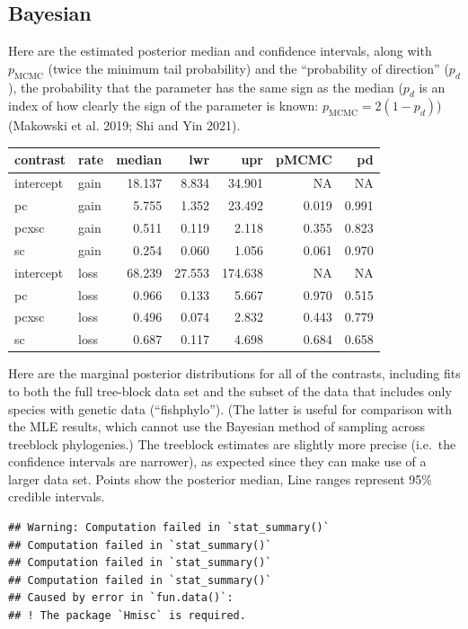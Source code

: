 \documentclass[
]{article}
\begin{document}
\hypertarget{bayesian}{%
\subsection{Bayesian}\label{bayesian}}

Here are the estimated posterior median and confidence intervals, along
with \(p_\textrm{MCMC}\) (twice the minimum tail probability) and the
``probability of direction'' (\(p_d\)), the probability that the
parameter has the same sign as the median (\(p_d\) is an index of how
clearly the sign of the parameter is known:
\(p_\textrm{MCMC} = 2(1-p_d)\)) (Makowski et al. 2019; Shi and Yin
2021).

\begin{longtable}[]{@{}llrrrrr@{}}
\toprule()
contrast & rate & median & lwr & upr & pMCMC & pd \\
\midrule()
\endhead
intercept & gain & 18.137 & 8.834 & 34.901 & NA & NA \\
pc & gain & 5.755 & 1.352 & 23.492 & 0.019 & 0.991 \\
pcxsc & gain & 0.511 & 0.119 & 2.118 & 0.355 & 0.823 \\
sc & gain & 0.254 & 0.060 & 1.056 & 0.061 & 0.970 \\
intercept & loss & 68.239 & 27.553 & 174.638 & NA & NA \\
pc & loss & 0.966 & 0.133 & 5.667 & 0.970 & 0.515 \\
pcxsc & loss & 0.496 & 0.074 & 2.832 & 0.443 & 0.779 \\
sc & loss & 0.687 & 0.117 & 4.698 & 0.684 & 0.658 \\
\bottomrule()
\end{longtable}

Here are the marginal posterior distributions for all of the contrasts,
including fits to both the full tree-block data set and the subset of
the data that includes only species with genetic data (``fishphylo'').
(The latter is useful for comparison with the MLE results, which cannot
use the Bayesian method of sampling across treeblock phylogenies.) The
treeblock estimates are slightly more precise (i.e.~the confidence
intervals are narrower), as expected since they can make use of a larger
data set. Points show the posterior median, Line ranges represent 95\%
credible intervals.

\begin{verbatim}
## Warning: Computation failed in `stat_summary()`
## Computation failed in `stat_summary()`
## Computation failed in `stat_summary()`
## Computation failed in `stat_summary()`
## Caused by error in `fun.data()`:
## ! The package `Hmisc` is required.
\end{verbatim}
\end{document}
